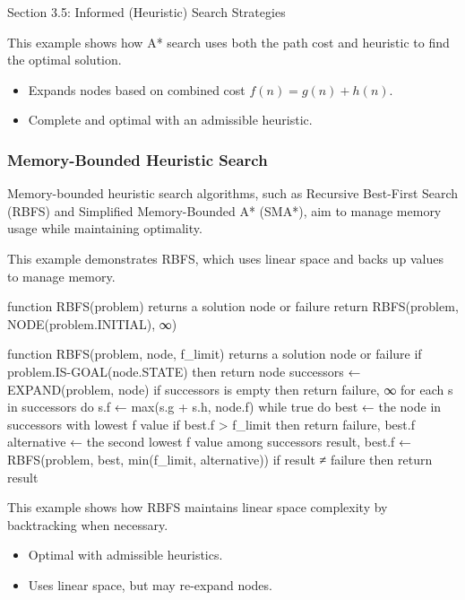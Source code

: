 \begin{notes}{Section 3.5: Informed (Heuristic) Search Strategies}
\begin{highlight}[A* Search]
    This example shows how A* search uses both the path cost and heuristic to find the optimal solution.
    
    \begin{itemize}
        \item Expands nodes based on combined cost $f(n) = g(n) + h(n)$.
        \item Complete and optimal with an admissible heuristic.
    \end{itemize}
    
    \end{highlight}
    
    \subsubsection*{Memory-Bounded Heuristic Search}
    
    Memory-bounded heuristic search algorithms, such as Recursive Best-First Search (RBFS) and Simplified Memory-Bounded A* (SMA*), aim to manage memory usage while maintaining optimality.
    
    \begin{highlight}
    
    This example demonstrates RBFS, which uses linear space and backs up values to manage memory.
    
    \begin{code}[Pseudo]
    function RBFS(problem) returns a solution node or failure
        return RBFS(problem, NODE(problem.INITIAL), ∞)
    
    function RBFS(problem, node, f_limit) returns a solution node or failure
        if problem.IS-GOAL(node.STATE) then return node
        successors ← EXPAND(problem, node)
        if successors is empty then return failure, ∞
        for each s in successors do
            s.f ← max(s.g + s.h, node.f)
        while true do
            best ← the node in successors with lowest f value
            if best.f > f_limit then return failure, best.f
            alternative ← the second lowest f value among successors
            result, best.f ← RBFS(problem, best, min(f_limit, alternative))
            if result ≠ failure then return result
    \end{code}
    
    This example shows how RBFS maintains linear space complexity by backtracking when necessary.
    
    \begin{itemize}
        \item Optimal with admissible heuristics.
        \item Uses linear space, but may re-expand nodes.
    \end{itemize}
    

\end{highlight}
\end{notes}
